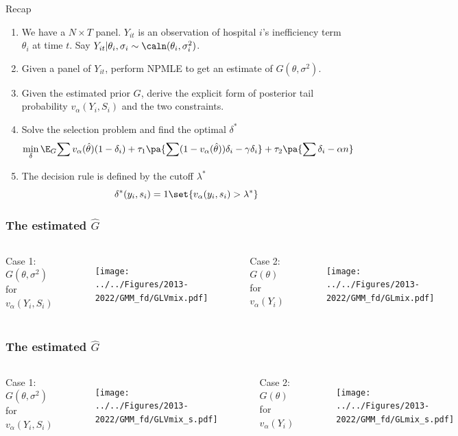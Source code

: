 \documentclass[10pt,mathserif,aspectratio=169]{beamer}
\begin{document}
\begin{frame}{Recap}

  \begin{enumerate}
    \item We have a $N\times T$ panel. $Y_{it}$ is an observation of hospital $i$'s
          inefficiency term $\theta_i$ at time $t$. Say $Y_{it}|\theta_i,\sigma_i \sim
            \caln(\theta_i,\sigma_i^2)$.
    \item Given a panel of $Y_{it}$, perform NPMLE to get an estimate of
          $G(\theta,\sigma^2)$.
    \item Given the estimated prior $G$, derive the explicit form of posterior tail
          probability $v_\alpha(Y_i,S_i)$ and the two constraints.
    \item Solve the selection problem and find the optimal $\delta^*$
          \begin{equation*}
            \min_{\delta}\E_G{\sum v_\alpha(\hat{\theta})(1-\delta_i) +\tau_1\pa{\sum (1-v_\alpha(\hat{\theta}))\delta_i -\gamma \delta_i} + \tau_2 \pa{\sum \delta_i -\alpha n}}
          \end{equation*}
    \item The decision rule is defined by the cutoff $\lambda^*$
          \[\delta^*(y_i,s_i)=1\set{v_\alpha(y_i,s_i)>\lambda^*}\]
  \end{enumerate}
\end{frame}

\begin{frame}
  \frametitle{The estimated $\hat{G}$}
  \begin{columns}[T,onlytextwidth]
    Case 1: $G(\theta,\sigma^2)$ for $v_\alpha(Y_i,S_i)$
    \begin{figure}
      \centering
      \texttt{[image: ../../Figures/2013-2022/GMM\_fd/GLVmix.pdf]}
    \end{figure}

    Case 2: $G(\theta)$ for $v_\alpha(Y_i)$
    \begin{figure}
      \centering
      \texttt{[image: ../../Figures/2013-2022/GMM\_fd/GLmix.pdf]}
    \end{figure}
  \end{columns}
\end{frame}

\begin{frame}
  \frametitle{The estimated $\hat{G}$}
  \begin{columns}[T,onlytextwidth]
    Case 1: $G(\theta,\sigma^2)$ for $v_\alpha(Y_i,S_i)$
    \begin{figure}
      \centering
      \texttt{[image: ../../Figures/2013-2022/GMM\_fd/GLVmix\_s.pdf]}
    \end{figure}

    Case 2: $G(\theta)$ for $v_\alpha(Y_i)$
    \begin{figure}
      \centering
      \texttt{[image: ../../Figures/2013-2022/GMM\_fd/GLmix\_s.pdf]}
    \end{figure}
  \end{columns}
\end{frame}
\end{document}
